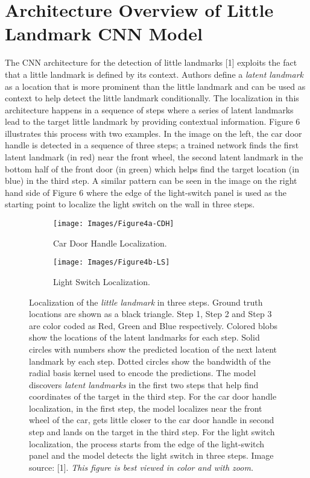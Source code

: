 \documentclass [11pt,letterpaper ,twoside ,openany ]{report}
\begin{document}
    \section{Architecture Overview of Little Landmark CNN Model}
    The CNN architecture for the detection of little landmarks [1] exploits the fact that a little landmark is defined by its context. Authors define a \textit {latent landmark} as a location that is more prominent than the little landmark and can be used as context to help detect the little landmark conditionally. The localization in this architecture happens in a sequence of steps where a series of latent landmarks lead to the target little landmark by providing contextual information. Figure 6 illustrates this process with two examples. In the image on the left, the car door handle is detected in a sequence of three steps; a trained network finds the first latent landmark (in red) near the front wheel, the second latent landmark in the bottom half of the front door (in green) which helps find the target location (in blue) in the third step. A similar pattern can be seen in the image on the right hand side of Figure 6 where the edge of the light-switch panel is used as the starting point to localize the light switch on the wall in three steps.

    \begin{figure}[h!]
    \centering
        \begin{subfigure}[b]{0.45\linewidth}
            \texttt{[image: Images/Figure4a-CDH]}
            \caption{Car Door Handle Localization.}
        \end{subfigure}
        \begin{subfigure}[b]{0.45\linewidth}
            \texttt{[image: Images/Figure4b-LS]}
            \caption{Light Switch Localization.}
        \end{subfigure}
        \caption{Localization of the \textit{little landmark} in three steps. Ground truth locations are shown as a black triangle. Step 1, Step 2 and Step 3 are color coded as Red, Green and Blue respectively. Colored blobs show the locations of the latent landmarks for each step. Solid circles with numbers show the predicted location of the next latent landmark by each step. Dotted circles show the bandwidth of the radial basis kernel used to encode the predictions. The model discovers \textit{latent landmarks} in the first two steps that help find coordinates of the target in the third step. For the car door handle localization, in the first step, the model localizes near the front wheel of the car, gets little closer to the car door handle in second step and lands on the target in the third step. For the light switch localization, the process starts from the edge of the light-switch panel and the model detects the light switch in three steps. Image source: [1]. \textit{This figure is best viewed in color and with zoom.}}
        \label{fig:localization}
    \end{figure}
\end{document}
